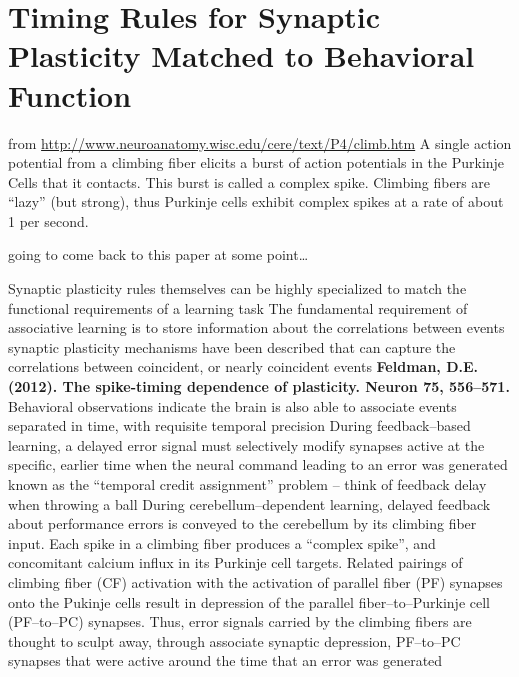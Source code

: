 \documentclass[11pt, a4paper, oneside]{article}   	%
\begin{document}
\section*{}
\section{Timing Rules for Synaptic Plasticity Matched to Behavioral Function \cite{Suvrathan2016}}
\label{MNCF:Suvrathan2016}

from \url{http://www.neuroanatomy.wisc.edu/cere/text/P4/climb.htm}
A single action potential from a climbing fiber elicits a burst of action potentials in the Purkinje Cells that it contacts. This burst is called a complex spike. Climbing fibers are ``lazy'' (but strong), thus Purkinje cells exhibit complex spikes at a rate of about 1 per second. 

going to come back to this paper at some point\ldots



\begin{outline}
    \point Synaptic plasticity rules themselves can be highly specialized to match the functional requirements of a learning task
    \point The fundamental requirement of associative learning is to store information about the correlations between events
        \subpoint synaptic plasticity mechanisms have been described that can capture the correlations between coincident, or nearly coincident events
           \subsubpoint \textbf{Feldman, D.E. (2012). The spike-timing dependence of plasticity. Neuron 75, 556–571.}
        \subpoint Behavioral observations indicate the brain is also able to associate events separated in time, with requisite temporal precision
            \subsubpoint During feedback--based learning, a delayed error signal must selectively modify synapses active at the specific, earlier time when the neural command leading to an error was generated
            \supersubpoint known as the ``temporal credit assignment'' problem -- think of feedback delay when throwing a ball
    \point During cerebellum--dependent learning, delayed feedback about performance errors is conveyed to the cerebellum by its climbing fiber input.
        \subpoint Each spike in a climbing fiber produces a ``complex spike'', and concomitant calcium influx in its Purkinje cell targets. Related pairings of climbing fiber (CF) activation with the activation of parallel fiber (PF) synapses onto the Pukinje cells result in depression of the parallel fiber--to--Purkinje cell (PF--to--PC) synapses.
            \subsubpoint Thus, error signals carried by the climbing fibers are thought to sculpt away, through associate synaptic depression, PF--to--PC synapses that were active around the time that an error was generated

    
\end{outline}
\end{document}
